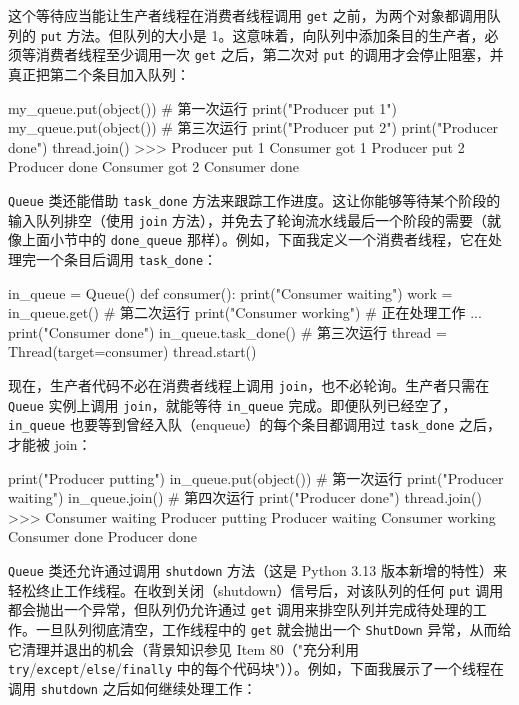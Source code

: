 这个等待应当能让生产者线程在消费者线程调用 \texttt{get} 之前，为两个对象都调用队列的 \texttt{put} 方法。但队列的大小是 1。这意味着，向队列中添加条目的生产者，必须等消费者线程至少调用一次 \texttt{get} 之后，第二次对 \texttt{put} 的调用才会停止阻塞，并真正把第二个条目加入队列：

\begin{codebox}[python]
my_queue.put(object())  # 第一次运行
print("Producer put 1")
my_queue.put(object())  # 第三次运行
print("Producer put 2")
print("Producer done")
thread.join()
>>>
Producer put 1
Consumer got 1
Producer put 2
Producer done
Consumer got 2
Consumer done
\end{codebox}

\texttt{Queue} 类还能借助 \texttt{task\_done} 方法来跟踪工作进度。这让你能够等待某个阶段的输入队列排空（使用 \texttt{join} 方法），并免去了轮询流水线最后一个阶段的需要（就像上面小节中的 \texttt{done\_queue} 那样）。例如，下面我定义一个消费者线程，它在处理完一个条目后调用 \texttt{task\_done}：

\begin{codebox}[python]
in_queue = Queue()
def consumer():
    print("Consumer waiting")
    work = in_queue.get()      # 第二次运行
    print("Consumer working")
    # 正在处理工作
    ...
    print("Consumer done")
    in_queue.task_done()       # 第三次运行
thread = Thread(target=consumer)
thread.start()
\end{codebox}

现在，生产者代码不必在消费者线程上调用 \texttt{join}，也不必轮询。生产者只需在 \texttt{Queue} 实例上调用 \texttt{join}，就能等待 \texttt{in\_queue} 完成。即便队列已经空了，\texttt{in\_queue} 也要等到曾经入队（enqueue）的每个条目都调用过 \texttt{task\_done} 之后，才能被 join：

\begin{codebox}[python]
print("Producer putting")
in_queue.put(object())     # 第一次运行
print("Producer waiting")
in_queue.join()            # 第四次运行
print("Producer done")
thread.join()
>>>
Consumer waiting
Producer putting
Producer waiting
Consumer working
Consumer done
Producer done
\end{codebox}

\texttt{Queue} 类还允许通过调用 \texttt{shutdown} 方法（这是 Python 3.13 版本新增的特性）来轻松终止工作线程。在收到关闭（shutdown）信号后，对该队列的任何 \texttt{put} 调用都会抛出一个异常，但队列仍允许通过 \texttt{get} 调用来排空队列并完成待处理的工作。一旦队列彻底清空，工作线程中的 \texttt{get} 就会抛出一个 \texttt{ShutDown} 异常，从而给它清理并退出的机会（背景知识参见 Item 80（"充分利用 \texttt{try}/\texttt{except}/\texttt{else}/\texttt{finally} 中的每个代码块"））。例如，下面我展示了一个线程在调用 \texttt{shutdown} 之后如何继续处理工作：

